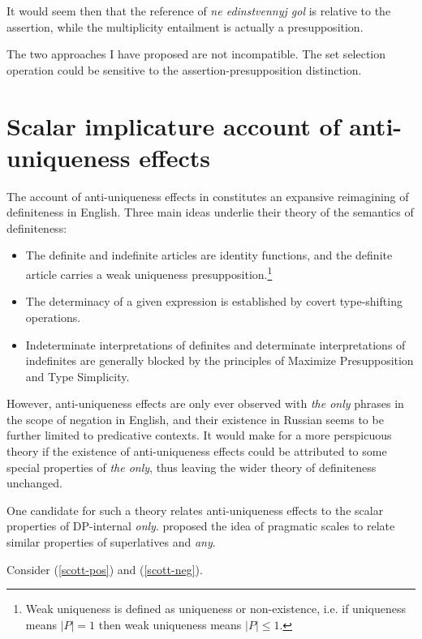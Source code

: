 \documentclass{article}
\begin{document}
It would seem then that the reference of \textit{ne edinstvennyj gol} is relative to the assertion, while the multiplicity entailment is actually a presupposition.

The two approaches I have proposed are not incompatible. The set selection operation could be sensitive to the assertion-presupposition distinction. %



\section{Scalar implicature account of anti-uniqueness effects \label{sec:scalar}}
The account of anti-uniqueness effects in \citet{cb2015, cb2012a} constitutes an expansive reimagining of definiteness in English. Three main ideas underlie their theory of the semantics of definiteness:

\begin{itemize}
	\item The definite and indefinite articles are identity functions, and the definite article carries a weak uniqueness presupposition.\footnote{Weak uniqueness is defined as uniqueness or non-existence, i.e. if uniqueness means $|P| = 1$ then weak uniqueness means $|P| \le 1$.}
	\item The determinacy of a given expression is established by covert type-shifting operations.
	\item Indeterminate interpretations of definites and determinate interpretations of indefinites are generally blocked by the principles of Maximize Presupposition and Type Simplicity.
\end{itemize}

However, anti-uniqueness effects are only ever observed with \textit{the only} phrases in the scope of negation in English, and their existence in Russian seems to be further limited to predicative contexts. It would make for a more perspicuous theory if the existence of anti-uniqueness effects could be attributed to some special properties of \textit{the only}, thus leaving the wider theory of definiteness unchanged.

One candidate for such a theory relates anti-uniqueness effects to the scalar properties of DP-internal \textit{only}. \citet{fauconnier75} proposed the idea of pragmatic scales to relate similar properties of superlatives and \textit{any}.


Consider (\ref{scott-pos}) and (\ref{scott-neg}).
\end{document}

